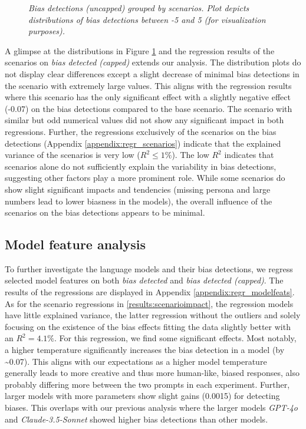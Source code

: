 \begin{figure}[htbp]
    \centering
    
    \caption[Distribution plots of bias detections by scenarios]{\centering \textit{Bias detections (uncapped) grouped by scenarios. Plot depicts distributions of bias detections between -5 and 5 (for visualization purposes).}}
    \label{fig:scenario-detections}
\end{figure}

\par A glimpse at the distributions in Figure \ref{fig:scenario-detections} and the regression results of the scenarios on \textit{bias detected (capped)} extends our analysis. The distribution plots do not display clear differences except a slight decrease of minimal bias detections in the scenario with extremely large values. This aligns with the regression results where this scenario has the only significant effect with a slightly negative effect (-0.07) on the bias detections compared to the base scenario. The scenario with similar but odd numerical values did not show any significant impact in both regressions. Further, the regressions exclusively of the scenarios on the bias detections (Appendix \ref{appendix:regr_scenarios}) indicate that the explained variance of the scenarios is very low ($R^2 \leq 1 \%$). The low $R^2$ indicates that scenarios alone do not sufficiently explain the variability in bias detections, suggesting other factors play a more prominent role. While some scenarios do show slight significant impacts and tendencies (missing persona and large numbers lead to lower biasness in the models), the overall influence of the scenarios on the bias detections appears to be minimal.


\subsection{Model feature analysis}
\label{results:modelanalysis}
\par To further investigate the language models and their bias detections, we regress selected model features on both \textit{bias detected} and \textit{bias detected (capped)}. The results of the regressions are displayed in Appendix \ref{appendix:regr_modelfeats}. As for the scenario regressions in \ref{results:scenarioimpact}, the regression models have little explained variance, the latter regression without the outliers and solely focusing on the existence of the bias effects fitting the data slightly better with an $R^2 = 4.1 \%$. For this regression, we find some significant effects. Most notably, a higher temperature significantly increases the bias detection in a model (by \textasciitilde{0.07}). This aligns with our expectations as a higher model temperature generally leads to more creative and thus more human-like, biased responses, also probably differing more between the two prompts in each experiment. Further, larger models with more parameters show slight gains (0.0015) for detecting biases. This overlaps with our previous analysis where the larger models \textit{GPT-4o} and \textit{Claude-3.5-Sonnet} showed higher bias detections than other models.

